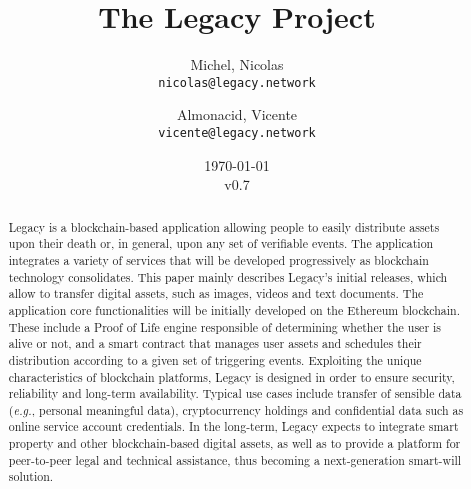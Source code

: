 \documentclass[12pt,french,english,notitlepage]{report} %
\title{The Legacy Project}
\author{
  Michel, Nicolas\\
  \texttt{nicolas@legacy.network}
  \and
  Almonacid, Vicente\\
  \texttt{vicente@legacy.network}
}
\date{\today\\v0.7}
\newcommand{\bibpath}{.}
\begin{document}

\maketitle
\begin{abstract}
    Legacy is a blockchain-based application allowing people to easily distribute assets upon their death or, in general, upon any set of verifiable events.
    The application integrates a variety of services that will be developed progressively as blockchain technology consolidates. 
    This paper mainly describes Legacy's initial releases, which allow to transfer digital assets, such as images, videos and text documents. 
    The application core functionalities will be initially developed on the Ethereum blockchain. These include a Proof of Life engine responsible of determining whether the user is alive or not, and a smart contract that manages user assets and schedules their distribution according to a given set of triggering events.
    Exploiting the unique characteristics of blockchain platforms, Legacy is designed in order to ensure security, reliability and long-term availability. 
    Typical use cases include transfer of sensible data (\textit{e.g.}, personal meaningful data), cryptocurrency holdings and confidential data such as online service account credentials.
    In the long-term, Legacy expects to integrate smart property and other blockchain-based digital assets, as well as to provide a platform for peer-to-peer legal and technical assistance, thus becoming a next-generation smart-will solution.

\end{abstract}




\tableofcontents




%



%

%
%

%

%
%
%
%
\printbibliography
\end{document}
